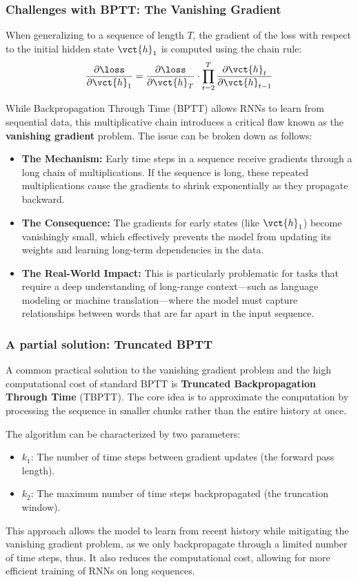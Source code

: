 \subsubsection{Challenges with BPTT: The Vanishing Gradient}

When generalizing to a sequence of length $T$, the gradient of the loss with respect to the initial hidden state $\vct{h}_1$ is computed using the chain rule:
\begin{equation}
    \frac{\partial \loss}{\partial \vct{h}_1} = \frac{\partial \loss}{\partial \vct{h}_T} \cdot \prod_{t=2}^{T} \frac{\partial \vct{h}_t}{\partial \vct{h}_{t-1}}
\end{equation}

While Backpropagation Through Time (BPTT) allows RNNs to learn from sequential data, this multiplicative chain introduces a critical flaw known as the \textbf{vanishing gradient} problem. The issue can be broken down as follows:

\begin{itemize}
    \item \textbf{The Mechanism:} Early time steps in a sequence receive gradients through a long chain of multiplications. If the sequence is long, these repeated multiplications cause the gradients to shrink exponentially as they propagate backward.
    \item \textbf{The Consequence:} The gradients for early states (like $\vct{h}_1$) become vanishingly small, which effectively prevents the model from updating its weights and learning long-term dependencies in the data.
    \item \textbf{The Real-World Impact:} This is particularly problematic for tasks that require a deep understanding of long-range context—such as language modeling or machine translation—where the model must capture relationships between words that are far apart in the input sequence.
\end{itemize}

\subsubsection{A partial solution: Truncated BPTT}
A common practical solution to the vanishing gradient problem and the high computational cost of standard BPTT is \textbf{Truncated Backpropagation Through Time} (TBPTT).
The core idea is to approximate the computation by processing the sequence in smaller chunks rather than the entire history at once.

The algorithm can be characterized by two parameters:
\begin{itemize}
    \item $k_1$: The number of time steps between gradient updates (the forward pass length).
    \item $k_2$: The maximum number of time steps backpropagated (the truncation window).
\end{itemize}
This approach allows the model to learn from recent history while mitigating the vanishing gradient problem, as we only backpropagate through a limited number of time steps,
thus. It also reduces the computational cost, allowing for more efficient training of RNNs on long sequences.

